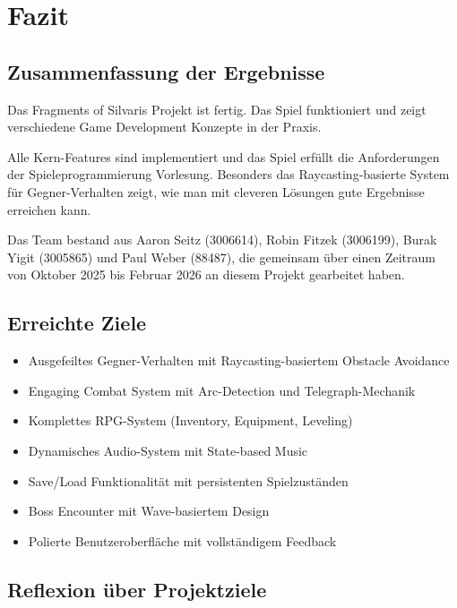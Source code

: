 \documentclass[
  a4paper,
  11pt,
  ngerman,
  parskip=half,
  bibliography=totoc,
  listof=totoc
]{scrreprt}
\begin{document}
\chapter{Fazit}

\section{Zusammenfassung der Ergebnisse}

Das Fragments of Silvaris Projekt ist fertig. Das Spiel funktioniert und zeigt verschiedene Game Development Konzepte in der Praxis.

Alle Kern-Features sind implementiert und das Spiel erfüllt die Anforderungen der Spieleprogrammierung Vorlesung. Besonders das Raycasting-basierte System für Gegner-Verhalten zeigt, wie man mit cleveren Lösungen gute Ergebnisse erreichen kann.

Das Team bestand aus Aaron Seitz (3006614), Robin Fitzek (3006199), Burak Yigit (3005865) und Paul Weber (88487), die gemeinsam über einen Zeitraum von Oktober 2025 bis Februar 2026 an diesem Projekt gearbeitet haben.

\section{Erreichte Ziele}

\begin{itemize}
    \item \checkmark Ausgefeiltes Gegner-Verhalten mit Raycasting-basiertem Obstacle Avoidance
    \item \checkmark Engaging Combat System mit Arc-Detection und Telegraph-Mechanik
    \item \checkmark Komplettes RPG-System (Inventory, Equipment, Leveling)
    \item \checkmark Dynamisches Audio-System mit State-based Music
    \item \checkmark Save/Load Funktionalität mit persistenten Spielzuständen
    \item \checkmark Boss Encounter mit Wave-basiertem Design
    \item \checkmark Polierte Benutzeroberfläche mit vollständigem Feedback
\end{itemize}

\section{Reflexion über Projektziele}
\end{document}
